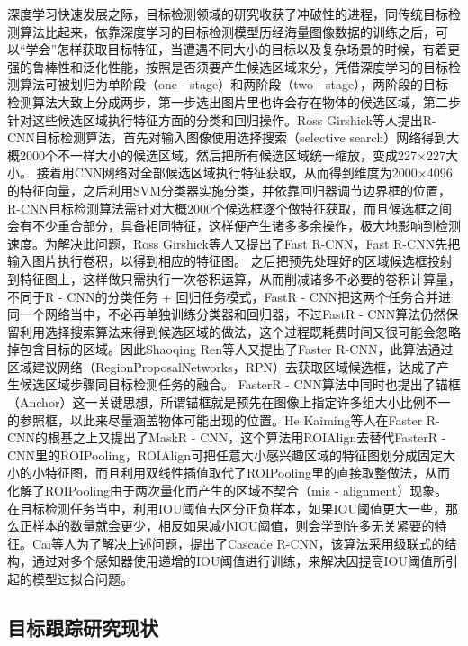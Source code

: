 深度学习快速发展之际，目标检测领域的研究收获了冲破性的进程，同传统目标检测算法比起来，依靠深度学习的目标检测模型历经海量图像数据的训练之后，可以“学会”怎样获取目标特征，当遭遇不同大小的目标以及复杂场景的时候，有着更强的鲁棒性和泛化性能，按照是否须要产生候选区域来分，凭借深度学习的目标检测算法可被划归为单阶段（one - stage）和两阶段（two - stage），两阶段的目标检测算法大致上分成两步，第一步选出图片里也许会存在物体的候选区域，第二步针对这些候选区域执行特征方面的分类和回归操作。Ross Girshick等人\cite{girshick2014rich}提出R-CNN目标检测算法，首先对输入图像使用选择搜索\cite{uijlings2013selective}（selective search）网络得到大概2000个不一样大小的候选区域，然后把所有候选区域统一缩放，变成227×227大小。 接着用CNN网络对全部候选区域执行特征获取，从而得到维度为2000×4096的特征向量，之后利用SVM分类器实施分类，并依靠回归器调节边界框的位置，R-CNN目标检测算法需针对大概2000个候选框逐个做特征获取，而且候选框之间会有不少重合部分，具备相同特征，这样便产生诸多多余操作，极大地影响到检测速度。为解决此问题，Ross Girshick等人\cite{girshick2015fast}又提出了Fast R-CNN，Fast R-CNN先把输入图片执行卷积，以得到相应的特征图。 之后把预先处理好的区域候选框投射到特征图上，这样做只需执行一次卷积运算，从而削减诸多不必要的卷积计算量，不同于R - CNN的分类任务 + 回归任务模式，FastR - CNN把这两个任务合并进同一个网络当中，不必再单独训练分类器和回归器，不过FastR - CNN算法仍然保留利用选择搜索算法来得到候选区域的做法，这个过程既耗费时间又很可能会忽略掉包含目标的区域。因此Shaoqing Ren等人\cite{ren2015faster}又提出了Faster R-CNN，此算法通过区域建议网络（RegionProposalNetworks，RPN）去获取区域候选框，达成了产生候选区域步骤同目标检测任务的融合。 FasterR - CNN算法中同时也提出了锚框（Anchor）这一关键思想，所谓锚框就是预先在图像上指定许多组大小比例不一的参照框，以此来尽量涵盖物体可能出现的位置。He Kaiming\cite{he2017mask}等人在Faster R-CNN的根基之上又提出了MaskR - CNN，这个算法用ROIAlign去替代FasterR - CNN里的ROIPooling，ROIAlign可把任意大小感兴趣区域的特征图划分成固定大小的小特征图，而且利用双线性插值取代了ROIPooling里的直接取整做法，从而化解了ROIPooling由于两次量化而产生的区域不契合（mis - alignment）现象。 在目标检测任务当中，利用IOU阈值去区分正负样本，如果IOU阈值更大一些，那么正样本的数量就会更少，相反如果减小IOU阈值，则会学到许多无关紧要的特征。Cai等人\cite{cai2018cascade}为了解决上述问题，提出了Cascade R-CNN，该算法采用级联式的结构，通过对多个感知器使用递增的IOU阈值进行训练，来解决因提高IOU阈值所引起的模型过拟合问题。

\subsection{目标跟踪研究现状}

